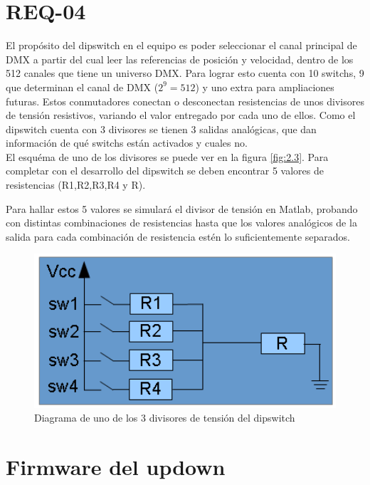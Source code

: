 \section{REQ-04} \label{sec:\thesection}
El propósito del dipswitch en el equipo es poder seleccionar el canal principal de DMX a partir del cual leer las referencias de posición y velocidad, dentro de los 512 canales que tiene un universo DMX. Para lograr esto cuenta con 10 switchs, 9 que determinan el canal de DMX (\( 2^9 = 512 \)) y uno extra para ampliaciones futuras. Estos conmutadores conectan o desconectan resistencias de unos divisores de tensión resistivos, variando el valor entregado por cada uno de ellos. Como el dipswitch cuenta con 3 divisores se tienen 3 salidas analógicas, que dan información de qué switchs están activados y cuales no. \\
El esquéma de uno de los divisores se puede ver en la figura \ref{fig:2.3}. Para completar con el desarrollo del dipswitch se deben encontrar 5 valores de resistencias (R1,R2,R3,R4 y R).

Para hallar estos 5 valores se simulará el divisor de tensión en Matlab, probando con distintas combinaciones de resistencias hasta que los valores analógicos de la salida para cada combinación de resistencia estén lo suficientemente separados.

\begin{figure}[!ht]
	\centering
	\includegraphics[width=12cm,scale=1]{resources/2_3-dipswitch.png}
	\caption{Diagrama de uno de los 3 divisores de tensión del dipswitch}
	\label{fig:\thefigure}
\end{figure}

\section{Firmware del updown} \label{sec:\thesection}

